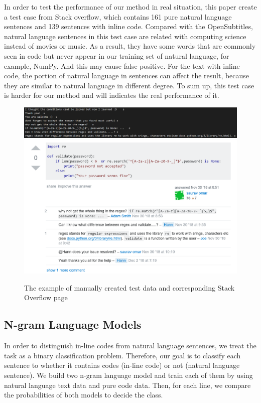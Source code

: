 \documentclass[conference]{IEEEtran}
\begin{document}
In order to test the performance of our method in real situation, this paper create a test case from Stack overflow, which contains 161 pure natural language sentences and 139 sentences with inline code. Compared with the OpenSubtitles, natural language sentences in this test case are related with computing science instead of movies or music. As a result, they have some words that are commonly seen in code but never appear in our training set of natural language, for example, NumPy. And this may cause false positive. For the text with inline code, the portion of natural language in sentences can affect the result, because they are similar to natural language in different degree. To sum up, this test case is harder for our method and will indicates the real performance of it.


\begin{figure}[ptbh]
\begin{center}
  \centering
  \includegraphics[width=16cm]{manualdata.png}
  \includegraphics[width=16cm]{SOpage.png}
  \caption{The example of manually created test data and corresponding Stack Overflow page}
 \end{center}
\end{figure}



\subsection{N-gram Language Models}
In order to distinguish in-line codes from natural language sentences, we treat the task as a binary classification problem. Therefore, our goal is to classify each sentence to whether it contains codes (in-line code) or not (natural language sentence). We build two n-gram language model and train each of them by using natural language text data and pure code data. Then, for each line, we compare the probabilities of both models to decide the class. 
\end{document}
